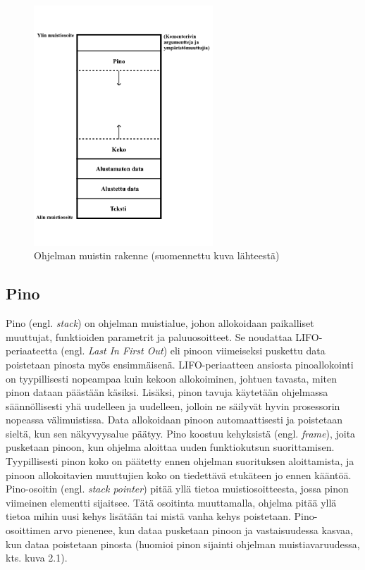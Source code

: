 \begin{figure}[tbh]
{\begin{centering}
\includegraphics[width=0.6\textwidth]{kuvat/muistin_rakenne.pdf}
\par\end{centering}}
\caption{Ohjelman muistin rakenne \cite{mmic2010} (suomennettu kuva lähteestä)}
\end{figure}

\subsection{Pino}

Pino (engl. \textit{stack}) on ohjelman muistialue, johon allokoidaan paikalliset muuttujat, funktioiden parametrit ja paluuosoitteet. Se noudattaa LIFO-periaateetta (engl. \textit{Last In First Out}) eli pinoon viimeiseksi puskettu data poistetaan pinosta myös ensimmäisenä. LIFO-periaatteen ansiosta pinoallokointi on tyypillisesti nopeampaa kuin kekoon allokoiminen, johtuen tavasta, miten pinon dataan päästään käsiksi. Lisäksi, pinon tavuja käytetään ohjelmassa säännöllisesti yhä uudelleen ja uudelleen, jolloin ne säilyvät hyvin prosessorin nopeassa välimuistissa. Data allokoidaan pinoon automaattisesti ja poistetaan sieltä, kun sen näkyvyysalue päätyy. Pino koostuu kehyksistä (engl. \textit{frame}), joita pusketaan pinoon, kun ohjelma aloittaa uuden funktiokutsun suorittamisen. Tyypillisesti pinon koko on päätetty ennen ohjelman suorituksen aloittamista, ja pinoon allokoitavien muuttujien koko on tiedettävä etukäteen jo ennen kääntöä.\cite{mmic2010}
Pino-osoitin (engl. \textit{stack pointer}) pitää yllä tietoa muistiosoitteesta, jossa pinon viimeinen elementti sijaitsee. Tätä osoitinta muuttamalla, ohjelma pitää yllä tietoa mihin uusi kehys lisätään tai mistä vanha kehys poistetaan. Pino-osoittimen arvo pienenee, kun dataa pusketaan pinoon ja vastaisuudessa kasvaa, kun dataa poistetaan pinosta (huomioi pinon sijainti ohjelman muistiavaruudessa, kts. kuva 2.1).\cite{sasp2006}

